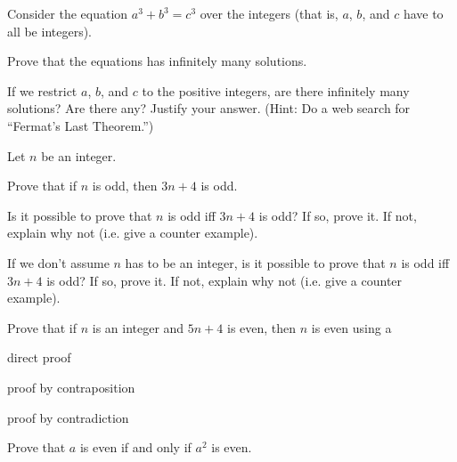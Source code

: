 \begin{pro}
Consider the equation $a^3+b^3=c^3$ over the integers (that is, $a$, $b$, and $c$ have to all be integers).
\begin{lenum}
\item
Prove that the equations has infinitely many solutions.
\item
If we restrict $a$, $b$, and $c$ to the positive integers, are there infinitely many solutions?  Are there any?
Justify your answer.
(Hint: Do a web search for ``Fermat's Last Theorem.'')
\end{lenum}
\end{pro}



\begin{pro}
Let $n$ be an integer.
\begin{lenum}
\item
Prove that if $n$ is odd, then $3n+4$ is odd.
\item
Is it possible to prove that $n$ is odd iff $3n+4$ is odd?  If so, prove it.  
If not, explain why not (i.e. give a counter example).
\item
If we don't assume $n$ has to be an integer, 
is it possible to prove that $n$ is odd iff $3n+4$ is odd?  If so, prove it.  
If not, explain why not (i.e. give a counter example).
\end{lenum}
\end{pro}


\begin{pro}
Prove that if $n$ is an integer and $5 n + 4$ is even, then $n$ is
even using a
\begin{lenum}
\item
direct proof
\item
proof by contraposition
\item
proof by contradiction
 \end{lenum}
\end{pro}

\begin{pro}
Prove that $a$ is even if and only if $a^2$ is even.
\end{pro}

